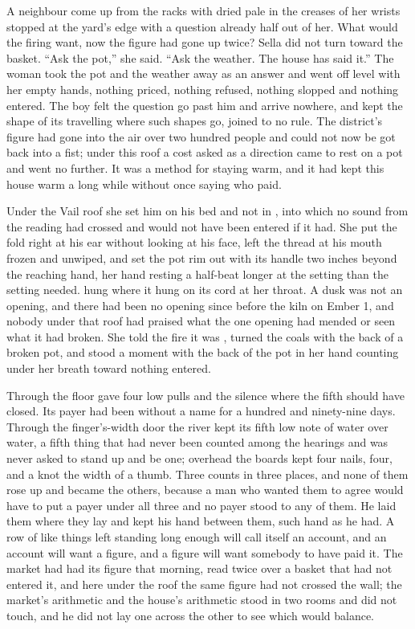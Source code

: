 A neighbour come up from the racks with  dried pale in the creases of her wrists stopped at the yard's edge with a question already half out of her. What would the firing want, now the figure had gone up twice? Sella did not turn toward the basket. “Ask the pot,” she said. “Ask the weather. The house has said it.” The woman took the pot and the weather away as an answer and went off level with her empty hands, nothing priced, nothing refused, nothing slopped and nothing entered. The boy felt the question go past him and arrive nowhere, and kept the shape of its travelling where such shapes go, joined to no rule. The district's figure had gone into the air over two hundred people and could not now be got back into a fist; under this roof a cost asked as a direction came to rest on a pot and went no further. It was a method for staying warm, and it had kept this house warm a long while without once saying who paid.

\scenebreak

Under the Vail roof she set him on his bed and not in , into which no sound from the reading had crossed and would not have been entered if it had. She put the fold right at his ear without looking at his face, left the thread at his mouth frozen and unwiped, and set the pot rim out with its handle two inches beyond the reaching hand, her hand resting a half-beat longer at the setting than the setting needed.  hung where it hung on its cord at her throat. A dusk was not an opening, and there had been no opening since before the kiln on Ember 1, and nobody under that roof had praised what the one opening had mended or seen what it had broken. She told the fire it was , turned the coals with the back of a broken pot, and stood a moment with the back of the pot in her hand counting under her breath toward nothing entered.

Through the floor  gave four low pulls and the silence where the fifth should have closed. Its payer had been without a name for a hundred and ninety-nine days. Through the finger's-width door the river kept its fifth low note of water over water, a fifth thing that had never been counted among the hearings and was never asked to stand up and be one; overhead the boards kept four nails, four, and a knot the width of a thumb. Three counts in three places, and none of them rose up and became the others, because a man who wanted them to agree would have to put a payer under all three and no payer stood to any of them. He laid them where they lay and kept his hand between them, such hand as he had. A row of like things left standing long enough will call itself an account, and an account will want a figure, and a figure will want somebody to have paid it. The market had had its figure that morning, read twice over a basket that had not entered it, and here under the roof the same figure had not crossed the wall; the market's arithmetic and the house's arithmetic stood in two rooms and did not touch, and he did not lay one across the other to see which would balance.

